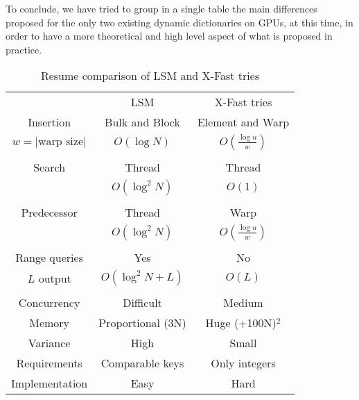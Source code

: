 To conclude, we have tried to group in a single table the main differences proposed for the only two existing dynamic dictionaries on GPUs, at this time, in order to have a more theoretical and high level aspect of what is proposed in practice.

\newpage

\begin{table}[!htb]
\centering
\caption{Resume comparison of LSM and X-Fast tries}
\label{my-label}
\begin{tabular}{ccc}
                     & LSM                  & X-Fast tries          \\
Insertion            & Bulk and Block       & Element and Warp       \\
$w = |\text{warp size}|$ & $O(\log N)$          & $O(\frac{\log u}{w})$ \\
\multicolumn{1}{l}{} & \multicolumn{1}{l}{} & \multicolumn{1}{l}{}  \\
Search               & Thread               & Thread                \\
                     & $O(\log^{2} N)$      & $O(1)$                \\
\multicolumn{1}{l}{} & \multicolumn{1}{l}{} & \multicolumn{1}{l}{}  \\
Predecessor          & Thread               & Warp                  \\
                     & $O(\log^{2} N)$      & $O(\frac{\log u}{w})$ \\
\multicolumn{1}{l}{} & \multicolumn{1}{l}{} & \multicolumn{1}{l}{}  \\
Range queries        & Yes                  & No\footnotemark       \\
$L$ output           & $O(\log^{2} N + L)$  & $O(L)$                \\
\multicolumn{1}{l}{} & \multicolumn{1}{l}{} & \multicolumn{1}{l}{}  \\
Concurrency          & Difficult            & Medium                \\
Memory               & Proportional (3N)    & Huge (+100N)$^{2}$    \\
Variance             & High                 & Small                 \\
Requirements         & Comparable keys      & Only integers         \\
Implementation       & Easy                 & Hard          
\end{tabular}
\end{table}
